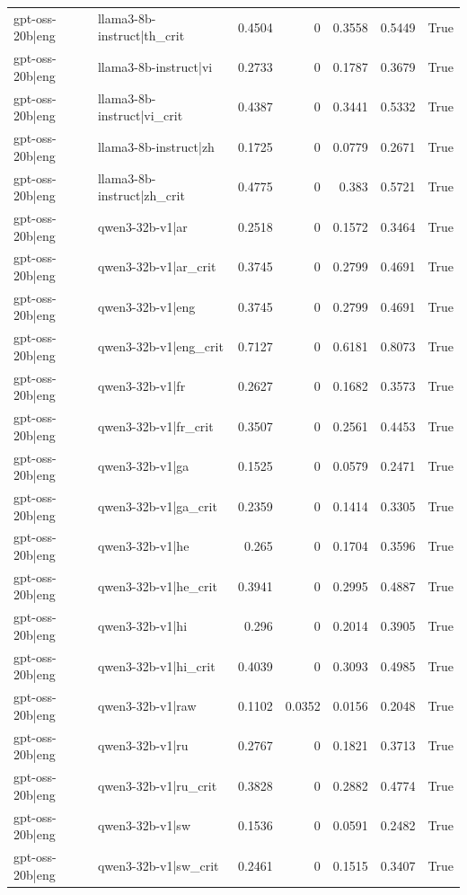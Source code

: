 \begin{table}
\begin{tabular}{l l r r r r l}
gpt-oss-20b|eng & llama3-8b-instruct|th_crit & 0.4504 & 0 & 0.3558 & 0.5449 & True \\
gpt-oss-20b|eng & llama3-8b-instruct|vi & 0.2733 & 0 & 0.1787 & 0.3679 & True \\
gpt-oss-20b|eng & llama3-8b-instruct|vi_crit & 0.4387 & 0 & 0.3441 & 0.5332 & True \\
gpt-oss-20b|eng & llama3-8b-instruct|zh & 0.1725 & 0 & 0.0779 & 0.2671 & True \\
gpt-oss-20b|eng & llama3-8b-instruct|zh_crit & 0.4775 & 0 & 0.383 & 0.5721 & True \\
gpt-oss-20b|eng & qwen3-32b-v1|ar & 0.2518 & 0 & 0.1572 & 0.3464 & True \\
gpt-oss-20b|eng & qwen3-32b-v1|ar_crit & 0.3745 & 0 & 0.2799 & 0.4691 & True \\
gpt-oss-20b|eng & qwen3-32b-v1|eng & 0.3745 & 0 & 0.2799 & 0.4691 & True \\
gpt-oss-20b|eng & qwen3-32b-v1|eng_crit & 0.7127 & 0 & 0.6181 & 0.8073 & True \\
gpt-oss-20b|eng & qwen3-32b-v1|fr & 0.2627 & 0 & 0.1682 & 0.3573 & True \\
gpt-oss-20b|eng & qwen3-32b-v1|fr_crit & 0.3507 & 0 & 0.2561 & 0.4453 & True \\
gpt-oss-20b|eng & qwen3-32b-v1|ga & 0.1525 & 0 & 0.0579 & 0.2471 & True \\
gpt-oss-20b|eng & qwen3-32b-v1|ga_crit & 0.2359 & 0 & 0.1414 & 0.3305 & True \\
gpt-oss-20b|eng & qwen3-32b-v1|he & 0.265 & 0 & 0.1704 & 0.3596 & True \\
gpt-oss-20b|eng & qwen3-32b-v1|he_crit & 0.3941 & 0 & 0.2995 & 0.4887 & True \\
gpt-oss-20b|eng & qwen3-32b-v1|hi & 0.296 & 0 & 0.2014 & 0.3905 & True \\
gpt-oss-20b|eng & qwen3-32b-v1|hi_crit & 0.4039 & 0 & 0.3093 & 0.4985 & True \\
gpt-oss-20b|eng & qwen3-32b-v1|raw & 0.1102 & 0.0352 & 0.0156 & 0.2048 & True \\
gpt-oss-20b|eng & qwen3-32b-v1|ru & 0.2767 & 0 & 0.1821 & 0.3713 & True \\
gpt-oss-20b|eng & qwen3-32b-v1|ru_crit & 0.3828 & 0 & 0.2882 & 0.4774 & True \\
gpt-oss-20b|eng & qwen3-32b-v1|sw & 0.1536 & 0 & 0.0591 & 0.2482 & True \\
gpt-oss-20b|eng & qwen3-32b-v1|sw_crit & 0.2461 & 0 & 0.1515 & 0.3407 & True \\

\end{tabular}
\end{table}
